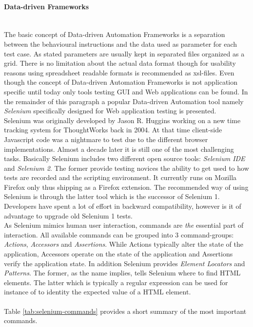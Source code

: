 \documentclass[12pt, notitlepage]{article}
\begin{document}
\paragraph{Data-driven Frameworks} ~\\
The basic concept of Data-driven Automation Frameworks is a separation between the behavioural instructions and the data used as parameter for each test case. 
As \cite{record-playback} stated parameters are usually kept in separated files organized as a grid. There is no limitation about the actual data format though
for usability reasons using spreadsheet readable formats is recommended as xsl-files. Even though the concept of Data-driven Automation Frameworks is not application specific until today only tools testing GUI and Web applications can be found. In the remainder of this paragraph a popular Data-driven Automation
tool namely \textit{Selenium}\cite{selenium} specifically designed for Web application testing is presented.\\
Selenium was originally developed by Jason R. Huggins working on a new time tracking system for ThoughtWorks back in 2004\cite{shortcut-selenium}.
At that time client-side Javascript code was a nightmare to test due to the different browser implementations. Almost a decade later it is still one of 
the most challenging tasks. Basically Selenium includes two different open source tools: \textit{Selenium IDE} and \textit{Selenium 2}. 
The former provide testing novices the ability to get used to how tests are recorded and the scripting environment. It currently runs on Mozilla Firefox only thus
shipping as a Firefox extension. The recommended way of using Selenium is through the latter tool which is the successor of Selenium 1. Developers have spent a lot of effort in backward compatibility, however is it of advantage to upgrade old Selenium 1 tests. \\
As Selenium mimics human user interaction, commands are \textit{the} essential part of interaction. All available commands can be
grouped into 3 command-groups: \textit{Actions}, \textit{Accessors} and \textit{Assertions}. While Actions typically alter the state of the application, Accessors operate on the state of the application and Assertions verify the application state. 
In addition Selenium provides \textit{Element Locators} and \textit{Patterns}. The former, as the name implies, tells Selenium where
to find HTML elements. The latter which is typically a regular expression can be used for instance of to identity the expected value 
of a HTML element.
\\\\ 
Table \ref{tab:selenium-commands} provides a short summary of the most important commands.\\ 
\end{document}
